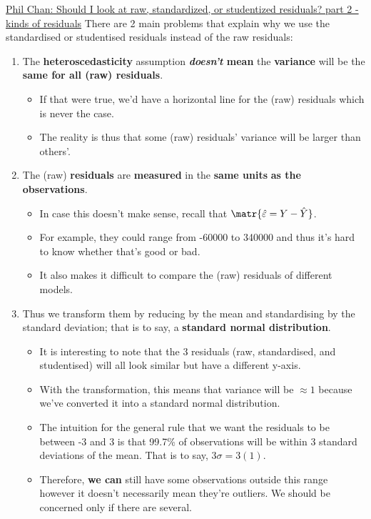 \documentclass[12pt, titlepage, french]{report}
\begin{document}
\begin{YTB_SUMM}{\href{https://www.youtube.com/watch?v=UyAa5iwJ7m0&list=PLe0nS0mZ7vGGhYcDPNSVNu9gT3wGHbjhu&index=4}{Phil Chan: Should I look at raw, standardized, or studentized residuals? part 2 - kinds of residuals}}
There are 2 main problems that explain why we use the standardised or studentised residuals instead of the raw residuals:
\begin{enumerate}
	\item	The \textbf{heteroscedasticity} assumption \textbf{\textit{doesn't} mean} the \textbf{variance} will be the \textbf{same for all (raw) residuals}.
	\begin{itemize}
		\item	If that were true, we'd have a horizontal line for the (raw) residuals which is never the case.
		\item	The reality is thus that some (raw) residuals' variance will be larger than others'.
	\end{itemize}
	\item	The (raw) \textbf{residuals} are \textbf{measured} in the \textbf{same units} \textbf{as the observations}.
	\begin{itemize}
		\item	In case this doesn't make sense, recall that $\matr{\hat{\varepsilon} = Y - \hat{Y}}$.
		\item	For example, they could range from -60000 to 340000 and thus it's hard to know whether that's good or bad.
		\item	It also makes it difficult to compare the (raw) residuals of different models.
	\end{itemize}
	\item	Thus we transform them by reducing by the mean and standardising by the standard deviation; that is to say, a \textbf{standard normal distribution}.
	\begin{itemize}
		\item	It is interesting to note that the 3 residuals (raw, standardised, and studentised) will all look similar but have a different y-axis.
		\item	With the transformation, this means that variance will be $\approx 1$ because we've converted it into a standard normal distribution.
		\item	The intuition for the general rule that we want the residuals to be between -3 and 3 is that 99.7\% of observations will be within 3 standard deviations of the mean. That is to say, $3 \sigma = 3 (1)$.
		\item	Therefore, \textbf{we can} still have some observations outside this range however it doesn't necessarily mean they're outliers. We should be concerned only if there are several.
	\end{itemize}
\end{enumerate}
\end{YTB_SUMM}
\end{document}
